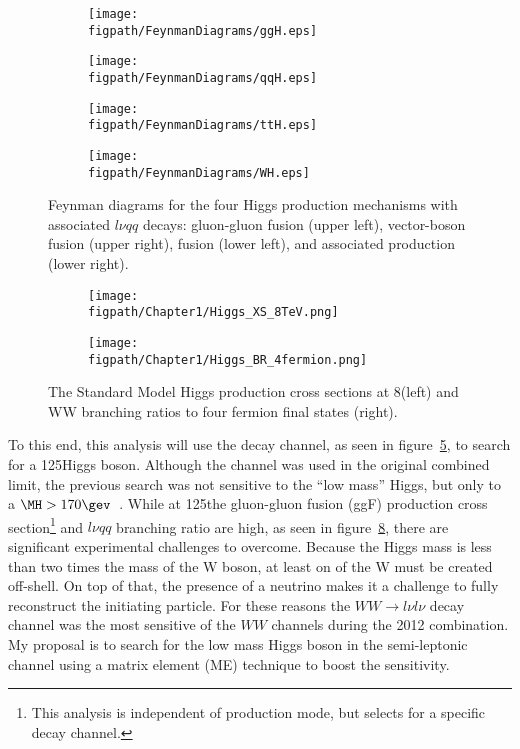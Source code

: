 \begin{figure}[bt]
	\centering
	\begin{subfigure}[t]{0.415\textwidth}
		\texttt{[image: \\figpath/FeynmanDiagrams/ggH.eps]}
		\label{fig:ggH}
	\end{subfigure}%
	\begin{subfigure}[t]{0.415\textwidth}
		\texttt{[image: \\figpath/FeynmanDiagrams/qqH.eps]}
		\label{fig:qqH}
	\end{subfigure}

	\begin{subfigure}[t]{0.415\textwidth}
		\texttt{[image: \\figpath/FeynmanDiagrams/ttH.eps]}
		\label{fig:ttH}
	\end{subfigure}%
	\begin{subfigure}[t]{0.415\textwidth}
		\texttt{[image: \\figpath/FeynmanDiagrams/WH.eps]}
		\label{fig:WH}
	\end{subfigure}
	\caption{Feynman diagrams for the four Higgs production mechanisms with associated $l{\nu}qq$ decays: gluon-gluon fusion (upper left), vector-boson fusion (upper right), \ttbar fusion (lower left), and associated production (lower right).}
	\label{fig:Higgs_WW_lnujj_feynman}
\end{figure}

\begin{figure}[!hbt]
	\centering
	\begin{subfigure}[t]{0.54\textwidth}
		\texttt{[image: \\figpath/Chapter1/Higgs\_XS\_8TeV.png]}
		\label{fig:CERN_accelerator_complex}
	\end{subfigure}
	\begin{subfigure}[t]{0.41\textwidth}
		\texttt{[image: \\figpath/Chapter1/Higgs\_BR\_4fermion.png]}
		\label{fig:LHC_LEP_injection_complex}
	\end{subfigure}
	\caption{The Standard Model Higgs production cross sections at 8\tev (left) and WW branching ratios to four fermion final states (right).}
	\label{fig:Higgs_XS_and_BR}
\end{figure}

To this end, this analysis will use the \HWWlnujj decay channel, as seen in figure~\ref{fig:Higgs_WW_lnujj_feynman}, to search for a 125\gev Higgs boson.
Although the \HWWlnujj channel was used in the original combined limit, the previous search was not sensitive to the ``low mass'' Higgs, but only to a $\MH>170\gev$~\cite{CMS-PAS-HIG-13-027}.
While at 125\gev the gluon-gluon fusion (ggF) production cross section\footnote{This analysis is independent of production mode, but selects for a specific decay channel.} and $l\nu{qq}$ branching ratio are high, as seen in figure~\ref{fig:Higgs_XS_and_BR}, there are significant experimental challenges to overcome.
Because the Higgs mass is less than two times the mass of the W boson, at least on of the W must be created off-shell.
On top of that, the presence of a neutrino makes it a challenge to fully reconstruct the initiating particle.
For these reasons the $WW\rightarrow{l\nu}{l\nu}$ decay channel was the most sensitive of the $WW$ channels during the 2012 combination.
My proposal is to search for the low mass Higgs boson in the semi-leptonic channel using a matrix element (ME) technique to boost the sensitivity.

